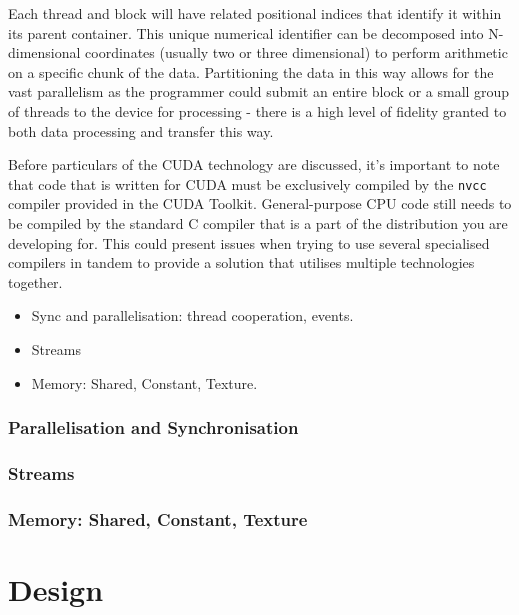 \documentclass[conference]{IEEEtran}
\begin{document}
Each thread and block will have related positional indices that identify it within its parent container. This unique numerical identifier can be decomposed into N-dimensional coordinates (usually two or three dimensional) to perform arithmetic on a specific chunk of the data. Partitioning the data in this way allows for the vast parallelism as the programmer could submit an entire block or a small group of threads to the device for processing - there is a high level of fidelity granted to both data processing and transfer this way.

Before particulars of the CUDA technology are discussed, it's important to note that code that is written for CUDA must be exclusively compiled by the \texttt{nvcc} compiler provided in the CUDA Toolkit. General-purpose CPU code still needs to be compiled by the standard C compiler that is a part of the distribution you are developing for. This could present issues when trying to use several specialised compilers in tandem to provide a solution that utilises multiple technologies together.

\begin{itemize}
    \item Sync and parallelisation: thread cooperation, events.
    \item Streams
    \item Memory: Shared, Constant, Texture.
\end{itemize}

\subsubsection{Parallelisation and Synchronisation}

\subsubsection{Streams}

\subsubsection{Memory: Shared, Constant, Texture}




\section{Design}
\label{sec:design}
\end{document}
